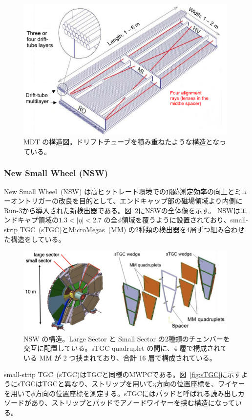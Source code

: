 \begin{figure}[tb]
  \centering
  \includegraphics[clip, width=11cm]{fig/2/MDT_chamber_schematics_2.pdf}
  \caption{MDT の構造図\cite{Aad:1129811}。ドリフトチューブを積み重ねたような構造となっている。}
  \label{fig:MDT}
\end{figure}


\subsubsection{New Small Wheel (NSW)}
New Small Wheel~(NSW) は高ヒットレート環境での飛跡測定効率の向上とミューオントリガーの改良を目的として、エンドキャップ部の磁場領域より内側にRun-3から導入された新検出器である\cite{article:NSW_tech}。図~\ref{fig:NSW}にNSWの全体像を示す。
NSWはエンドキャプ領域の$1.3 < |\eta| < 2.7$ の全$\phi$領域を覆うように設置されており、small-strip TGC~(sTGC)とMicroMegas~(MM) の2種類の検出器を4層ずつ組み合わせた構造をしている。
\begin{figure}[tb]
  \centering
  \includegraphics[clip, width=11cm]{fig/2/nsw-structure.png}
  \caption{NSW の構造\cite{article:NSW}。Large Sector と Small Sector の2種類のチェンバーを交互に配置している。sTGC quadruplet の間に、4 層で構成されている MM が 2 つ挟まれており、合計 16 層で構成されている。}
  \label{fig:NSW}
\end{figure}

small-strip TGC~(sTGC)はTGCと同様のMWPCである。図~\ref{fig:sTGC}に示すようにsTGCはTGCと異なり、ストリップを用いて$\eta$方向の位置座標を、ワイヤーを用いて$\phi$方向の位置座標を測定する。sTGCにはパッドと呼ばれる読み出しカソードがあり、ストリップとパッドでアノードワイヤーを挟む構造になっている。

